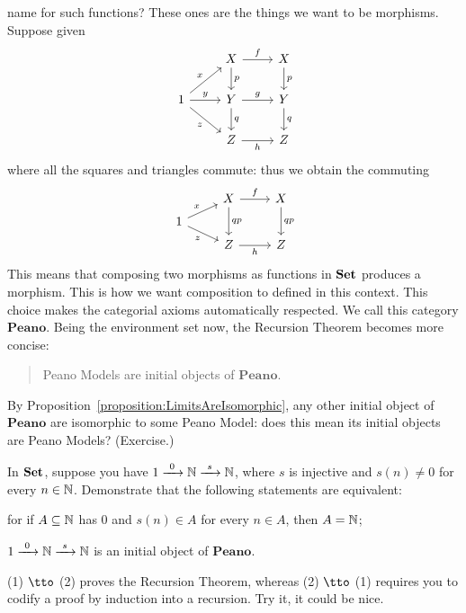 \begin{example}[Recursion]
{    name for such functions?} These ones are the things we want to be
  morphisms. Suppose given
  \[\begin{tikzcd}
      & X \ar["f", r] \ar["p", d] & X \ar["p", d] \\
      1 \ar["x", ur] \ar["y", r] \ar["z", dr, swap] & Y \ar["g", r] \ar["q", d] & Y \ar["q", d] \\
      & Z \ar["h", r, swap] & Z
    \end{tikzcd}\] where all the squares and triangles commute: thus
  we obtain the commuting
  \[\begin{tikzcd}[row sep=tiny]
      & X \ar["f", r] \ar["qp", dd] & X \ar["qp", dd] \\
      1 \ar["x", ur] \ar["z", dr, swap] \\
      & Z \ar["h", r, swap] & Z
    \end{tikzcd}\] This means that composing two morphisms as
  functions in \(\mathbf{Set}\) produces a morphism. This is how we want
  composition to defined in this context. This choice makes the
  categorial axioms automatically respected. We call this category
  \(\mathbf{Peano}\). \newline Being the environment set now, the Recursion Theorem
  becomes more concise:
  \begin{quotation}
    Peano Models are initial objects of \(\mathbf{Peano}\).
  \end{quotation}
  By Proposition~\ref{proposition:LimitsAreIsomorphic}, any other
  initial object of \(\mathbf{Peano}\) are isomorphic to some Peano
  Model: does this mean its initial objects are Peano Models?
  (Exercise.)
\end{example}

\begin{exercise}
  In \(\mathbf{Set}\), suppose you have
  \(1 \xrightarrow{\ 0\ } \mathbb N \xrightarrow{\ s\ } \mathbb N\), where \(s\) is
  injective and \(s(n) \ne 0\) for every \(n \in \mathbb N\). Demonstrate
  that the following statements are equivalent:
  \begin{tcbenum}
  \item for if \(A \subseteq \mathbb N\) has \(0\) and \(s(n) \in A\) for every
    \(n \in A\), then \(A = \mathbb N\);
  \item \(1 \xrightarrow{\ 0\ } \mathbb N \xrightarrow{\ s\ } \mathbb N\) is an initial
    object of \(\mathbf{Peano}\).
  \end{tcbenum}
  (1) \(\tto\) (2) proves the Recursion Theorem, whereas (2) \(\tto\)
  (1) requires you to codify a proof by induction into a
  recursion. Try it, it could be nice. 
\end{exercise}

